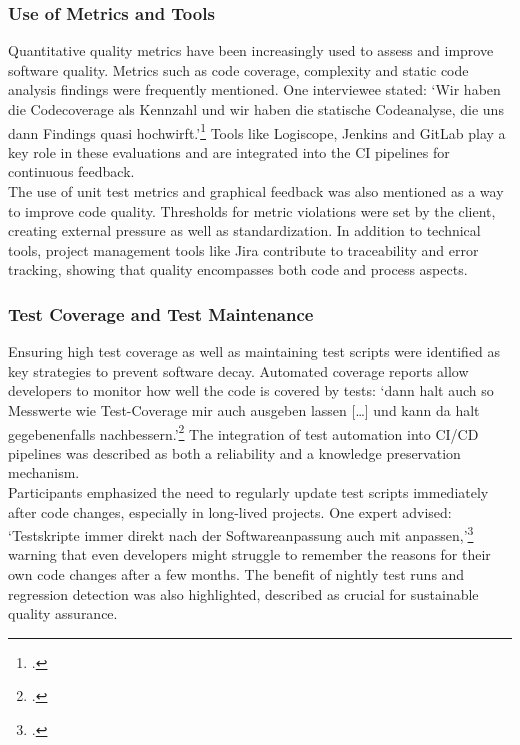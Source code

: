 \subsubsection{Use of Metrics and Tools}
Quantitative quality metrics have been increasingly used to assess and improve software quality. Metrics such as code coverage, complexity and static code analysis findings were frequently mentioned. One interviewee stated: `Wir haben die Codecoverage als Kennzahl und wir haben die statische Codeanalyse,
die uns dann Findings quasi hochwirft.'\footcite{Interview32025} Tools like Logiscope, Jenkins and GitLab play a key role in these evaluations and are integrated into the CI pipelines for continuous feedback.\\
The use of unit test metrics and graphical feedback was also mentioned as a way to improve code quality. Thresholds for metric violations were set by the client, creating external pressure as well as standardization. In addition to technical tools, project management tools like Jira contribute to traceability and error tracking,
showing that quality encompasses both code and process aspects.\\

\subsubsection{Test Coverage and Test Maintenance}
Ensuring high test coverage as well as maintaining test scripts were identified as key strategies to prevent software decay. Automated coverage reports allow developers to monitor how well the code is covered by tests: `dann halt auch so Messwerte wie Test-Coverage mir auch ausgeben lassen [\ldots] und kann da halt gegebenenfalls nachbessern.'\footcite{Interview32025}
The integration of test automation into CI/CD pipelines was described as both a reliability and a knowledge preservation mechanism.\\
Participants emphasized the need to regularly update test scripts immediately after code changes, especially in long-lived projects. One expert advised: `Testskripte immer direkt nach der Softwareanpassung auch mit anpassen,'\footcite{Interview12025} warning that even developers might struggle to remember the reasons for their own code changes after a few months.
The benefit of nightly test runs and regression detection was also highlighted, described as crucial for sustainable quality assurance.\\

